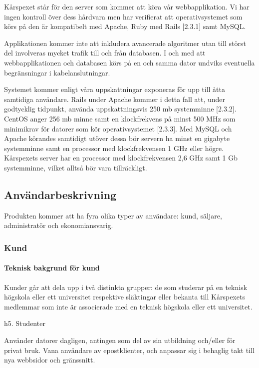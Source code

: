 \documentclass[a4paper, twoside, 11pt, titlepage]{article}
\begin{document}
		Kårspexet står för den server som kommer att köra vår webbapplikation. Vi har ingen kontroll över dess hårdvara men har verifierat att operativsystemet som körs på den är kompatibelt med Apache, Ruby med Rails [2.3.1] samt MySQL. 

		Applikationen kommer inte att inkludera avancerade algoritmer utan till störst del involveras mycket trafik till och från databasen. I och med att webbapplikationen och databasen körs på en och samma dator undviks eventuella begränsningar i kabelanslutningar.

		Systemet kommer enligt våra uppskattningar exponeras för upp till åtta samtidiga användare. Rails under Apache kommer i detta fall att, under godtycklig tidpunkt, använda uppskattningsvis 250 mb systemminne [2.3.2]. CentOS anger 256 mb minne samt en klockfrekvens på minst 500 MHz som minimikrav för datorer som kör operativsystemet [2.3.3]. Med MySQL och Apache körandes samtidigt utöver dessa bör servern ha minst en gigabyte systemminne samt en processor med klockfrekvensen 1 GHz eller högre. Kårspexets server har en processor med klockfrekvensen 2,6 GHz samt 1 Gb systemminne, vilket alltså bör vara tillräckligt.

	\subsection{Användarbeskrivning}


	Produkten kommer att ha fyra olika typer av användare: kund, säljare, administratör och ekonomiansvarig.

		\subsubsection{Kund}



			\paragraph{Teknisk bakgrund för kund}

			Kunder går att dela upp i två distinkta grupper: de som studerar på en teknisk högskola eller ett universitet respektive släktingar eller bekanta till Kårspexets medlemmar som inte är associerade med en teknisk högskola eller ett universitet.

			h5. Studenter

			Använder datorer dagligen, antingen som del av sin utbildning och/eller för privat bruk. Vana användare av epostklienter, och anpassar sig i behaglig takt till nya webbsidor och gränssnitt.
\end{document}

